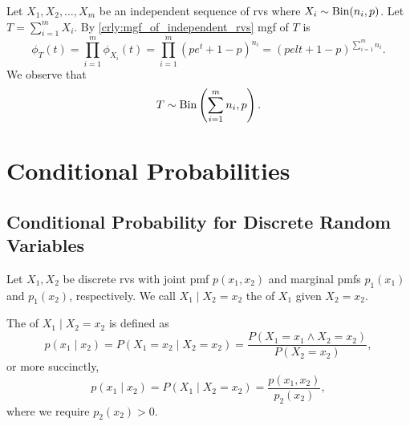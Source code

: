 \documentclass[notoc,notitlepage]{tufte-book}
\begin{document}
\begin{eg}
  Let $X_1, X_2, \ldots, X_m$ be an independent sequence of rvs where $X_i \sim
  \operatorname{Bin}(n_i, p)$. Let $T = \sum_{i=1}^{m} X_i$. By
  \cref{crly:mgf_of_independent_rvs} mgf of $T$ is
  \begin{equation*}
    \phi_T(t) = \prod_{i=1}^{m} \phi_{X_i}(t) = \prod_{i=1}^{m} (pe^t + 1 -
    p)^{n_i} = \left( pelt + 1 - p \right)^{\sum_{i=1}^{m} n_i}.
  \end{equation*}
  We observe that
  \begin{equation*}
    T \sim \operatorname{Bin} \left( \sum_{i=1}^{m} n_i, p \right).
  \end{equation*}
\end{eg}



\chapter{Conditional Probabilities}%
\label{chp:conditional_probabilities}

\section{Conditional Probability for Discrete Random Variables}%
\label{sec:conditional_probability_for_discrete_random_variables}

\begin{defn}\label{defn:conditional_distribution_of_discrete_random_variables}
  Let $X_1, X_2$ be discrete rvs with joint pmf $p(x_1, x_2)$ and marginal pmfs
  $p_1(x_1)$ and $p_1(x_2)$, respectively. We call $X_1 \mid X_2 = x_2$ the
   of $X_1$ given $X_2 = x_2$.

  The  of $X_1 \mid X_2 = x_2$ is defined as
  \begin{equation*}
    p(x_1 \mid x_2) = P(X_1 = x_2 \mid X_2 = x_2) = \frac{P(X_1 = x_1 \land X_2
    = x_2)}{P(X_2 = x_2)},
  \end{equation*}
  or more succinctly,
  \begin{equation*}
    p(x_1 \mid x_2) = P(X_1 \mid X_2 = x_2) = \frac{p(x_1, x_2)}{p_2(x_2)},
  \end{equation*}
  where we require $p_2(x_2) > 0$.
\end{defn}
\end{document}
